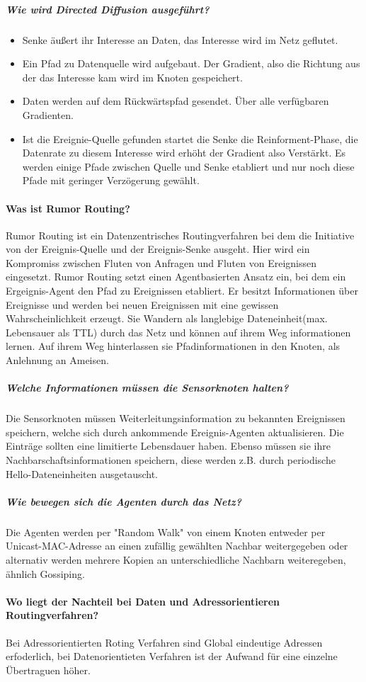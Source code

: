 	\subparagraph{Wie wird Directed Diffusion ausgeführt?}
	\begin{itemize}
		\item Senke äußert ihr Interesse an Daten, das Interesse wird im Netz geflutet.
		\item Ein Pfad zu Datenquelle wird aufgebaut. Der Gradient, also die Richtung aus der das Interesse kam wird im Knoten gespeichert.
		\item Daten werden auf dem Rückwärtspfad gesendet. Über alle verfügbaren Gradienten.
		\item Ist die Ereignie-Quelle gefunden startet die Senke die Reinforment-Phase, die Datenrate zu diesem Interesse wird erhöht der Gradient also Verstärkt. Es werden einige Pfade zwischen Quelle und Senke etabliert und nur noch diese Pfade mit geringer Verzögerung gewählt.
	\end{itemize}
	
	\paragraph{Was ist Rumor Routing?}
	Rumor Routing ist ein Datenzentrisches Routingverfahren bei dem die Initiative von der Ereignis-Quelle und der Ereignis-Senke ausgeht. Hier wird ein Kompromiss zwischen Fluten von Anfragen und Fluten von Ereignissen eingesetzt.
	Rumor Routing setzt einen Agentbasierten Ansatz ein, bei dem ein Ergeignis-Agent den Pfad zu Ereignissen etabliert. Er besitzt Informationen über Ereignisse und werden bei neuen Ereignissen mit eine gewissen Wahrscheinlichkeit erzeugt. Sie Wandern als langlebige Dateneinheit(max. Lebensauer als TTL) durch das Netz und können auf ihrem Weg informationen lernen. Auf ihrem Weg hinterlassen sie Pfadinformationen in den Knoten, als Anlehnung an Ameisen.
	\subparagraph{Welche Informationen müssen die Sensorknoten halten?}
	Die Sensorknoten müssen Weiterleitungsinformation zu bekannten Ereignissen speichern, welche sich durch ankommende Ereignis-Agenten aktualisieren. Die Einträge sollten eine limitierte Lebensdauer haben. Ebenso müssen sie ihre Nachbarschaftsinformationen speichern, diese werden z.B. durch periodische Hello-Dateneinheiten ausgetauscht.
	\subparagraph{Wie bewegen sich die Agenten durch das Netz?}
	Die Agenten werden per "Random Walk" von einem Knoten entweder per Unicast-MAC-Adresse an einen zufällig gewählten Nachbar weitergegeben oder alternativ werden mehrere Kopien an unterschiedliche Nachbarn weiteregeben, ähnlich Gossiping.
	
	\paragraph{Wo liegt der Nachteil bei Daten und Adressorientieren Routingverfahren?}
	Bei Adressorientierten Roting Verfahren sind Global eindeutige Adressen erfoderlich, bei Datenorientieten Verfahren ist der Aufwand für eine einzelne Übertraguen höher.
	
